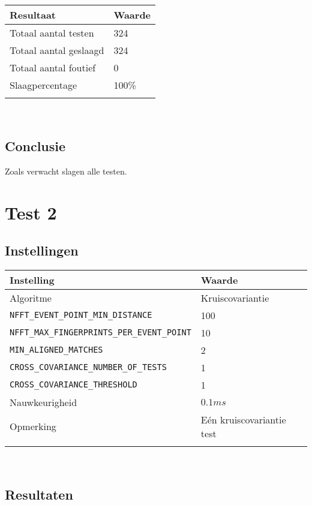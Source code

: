 \begin{tabular}{ l  l}
	\hline
	\textbf{Resultaat} & \textbf{Waarde} \\
	\hline
	Totaal aantal testen & 324 \\
	Totaal aantal geslaagd & 324 \\
	Totaal aantal foutief & 0 \\
	Slaagpercentage & 100\% \\
	\\
\end{tabular}\\

\subsection*{Conclusie}

Zoals verwacht slagen alle testen.

\section*{Test 2}

\subsection*{Instellingen}

\begin{tabular}{ l  l}
	\hline
	\textbf{Instelling} & \textbf{Waarde} \\
	\hline
	Algoritme & Kruiscovariantie \\
	\texttt{NFFT\_EVENT\_POINT\_MIN\_DISTANCE} & 100 \\
	\texttt{NFFT\_MAX\_FINGERPRINTS\_PER\_EVENT\_POINT} & 10 \\
	\texttt{MIN\_ALIGNED\_MATCHES} & 2 \\
	\texttt{CROSS\_COVARIANCE\_NUMBER\_OF\_TESTS} & 1 \\
	\texttt{CROSS\_COVARIANCE\_THRESHOLD} & 1 \\
	Nauwkeurigheid & $0.1ms$ \\
	Opmerking & Eén kruiscovariantie test \\
	\\
\end{tabular}\\

\subsection*{Resultaten}

